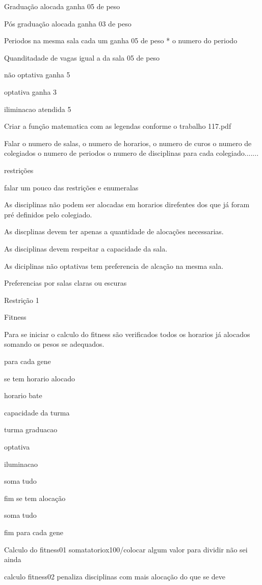 \documentclass{abntpuc}
\begin{document}
Graduação alocada ganha 05 de peso

Pós graduação alocada ganha 03 de peso

Periodos na mesma sala cada um ganha 05 de peso * o numero do periodo

Quanditadade de vagas igual a da sala 05 de peso

não optativa ganha 5

optativa ganha 3

iliminacao atendida 5

Criar a função matematica com as legendas conforme o trabalho 117.pdf

Falar o numero de salas, o numero de horarios, o numero de curos o numero de colegiados o numero de periodos o numero de disciplinas para cada colegiado.......

restrições 


falar um pouco das restrições e enumeralas

As disciplinas não podem ser alocadas em horarios direfentes dos que já foram pré definidos pelo colegiado.

As discplinas devem ter apenas a quantidade de alocações necessarias.

As disciplinas devem respeitar a capacidade da sala.

As diciplinas não optativas tem preferencia de alcação na mesma sala.

Preferencias por salas claras ou escuras

Restrição 1 


Fitness

Para se iniciar o calculo do fitness são verificados todos os horarios já alocados somando os pesos se adequados.

para cada gene

se tem horario alocado 

horario bate

capacidade da turma

turma graduacao

optativa

iluminacao

soma tudo

fim se tem alocação

soma tudo

fim para cada gene

Calculo do fitness01 somatatoriox100/colocar algum valor  para dividir não sei ainda

calculo fitness02 penaliza disciplinas com mais alocação do que se deve
\end{document}
